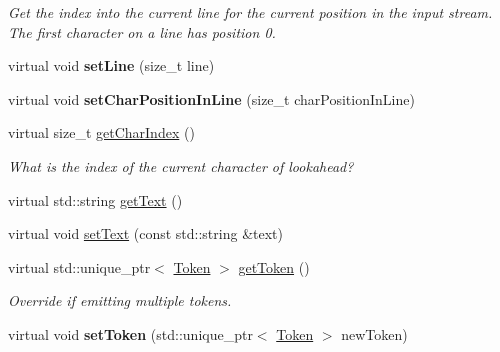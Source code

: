 \begin{DoxyCompactItemize}
\begin{DoxyCompactList}\small\item\em Get the index into the current line for the current position in the input stream. The first character on a line has position 0. \end{DoxyCompactList}\item 
\mbox{\label{classantlr4_1_1Lexer_a8e4716bdc8c2b55ac57735caed01c49f}} 
virtual void {\bfseries set\+Line} (size\+\_\+t line)
\item 
\mbox{\label{classantlr4_1_1Lexer_aba24bc8e2f386a91f8259e4cf6e863e7}} 
virtual void {\bfseries set\+Char\+Position\+In\+Line} (size\+\_\+t char\+Position\+In\+Line)
\item 
\mbox{\label{classantlr4_1_1Lexer_a6cc2284389bd2cda03741eab05fc7d45}} 
virtual size\+\_\+t \hyperlink{classantlr4_1_1Lexer_a6cc2284389bd2cda03741eab05fc7d45}{get\+Char\+Index} ()
\begin{DoxyCompactList}\small\item\em What is the index of the current character of lookahead? \end{DoxyCompactList}\item 
virtual std\+::string \hyperlink{classantlr4_1_1Lexer_aafc9e77d18978addc5c1fb99cc458f27}{get\+Text} ()
\item 
virtual void \hyperlink{classantlr4_1_1Lexer_a574e80225f28d8a8005afbe370da9028}{set\+Text} (const std\+::string \&text)
\item 
\mbox{\label{classantlr4_1_1Lexer_a20c4e8c7d351bba6d973c63355581357}} 
virtual std\+::unique\+\_\+ptr$<$ \hyperlink{classantlr4_1_1Token}{Token} $>$ \hyperlink{classantlr4_1_1Lexer_a20c4e8c7d351bba6d973c63355581357}{get\+Token} ()
\begin{DoxyCompactList}\small\item\em Override if emitting multiple tokens. \end{DoxyCompactList}\item 
\mbox{\label{classantlr4_1_1Lexer_ad73f790c4ab396aefb37c45a3f00739f}} 
virtual void {\bfseries set\+Token} (std\+::unique\+\_\+ptr$<$ \hyperlink{classantlr4_1_1Token}{Token} $>$ new\+Token)
\item 
\mbox{\label{classantlr4_1_1Lexer_a6666e0322f9058c1c9cd30a6b818f705}} 

\end{DoxyCompactItemize}
